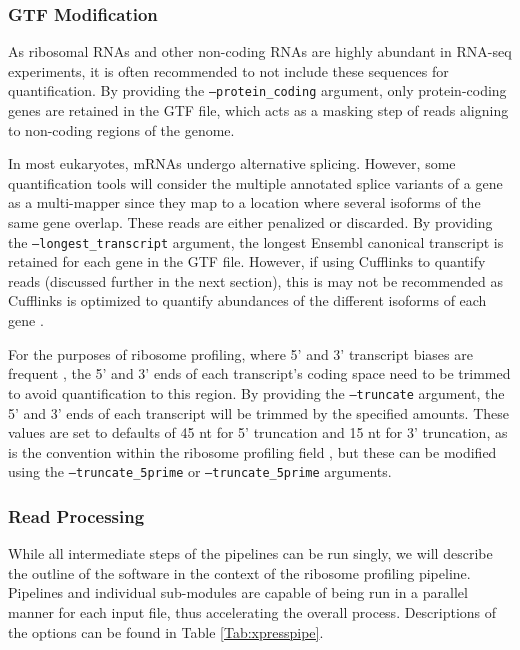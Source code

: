 \documentclass[11pt, a4paper, oneside]{article}
\begin{document}
\subsubsection{GTF Modification}
As ribosomal RNAs and other non-coding RNAs are highly abundant in RNA-seq experiments, it is often recommended to not include these sequences for quantification. By providing the \texttt{--protein\_coding} argument, only protein-coding genes are retained in the GTF file, which acts as a masking step of reads aligning to non-coding regions of the genome. \par

In most eukaryotes, mRNAs undergo alternative splicing. However, some quantification tools will consider the multiple annotated splice variants of a gene as a multi-mapper since they map to a location where several isoforms of the same gene overlap. These reads are either penalized or discarded. By providing the \texttt{--longest\_transcript} argument, the longest Ensembl canonical transcript \cite{ensembl_canon} is retained for each gene in the GTF file. However, if using Cufflinks to quantify reads (discussed further in the next section), this is may not be recommended as Cufflinks is optimized to quantify abundances of the different isoforms of each gene \cite{cufflinks}. \par

For the purposes of ribosome profiling, where 5' and 3' transcript biases are frequent \cite{ingolia_meth, weinberg_reports}, the 5' and 3' ends of each transcript's coding space need to be trimmed to avoid quantification to this region. By providing the \texttt{--truncate} argument, the 5' and 3' ends of each transcript will be trimmed by the specified amounts. These values are set to defaults of 45 nt for 5' truncation and 15 nt for 3' truncation, as is the convention within the ribosome profiling field \cite{ingolia_meth}, but these can be modified using the \texttt{--truncate\_5prime} or \texttt{--truncate\_5prime} arguments.

\subsubsection{Read Processing}
While all intermediate steps of the pipelines can be run singly, we will describe the outline of the software in the context of the ribosome profiling pipeline. Pipelines and individual sub-modules are capable of being run in a parallel manner for each input file, thus accelerating the overall process. Descriptions of the options can be found in Table \ref{Tab:xpresspipe}.
\end{document}
